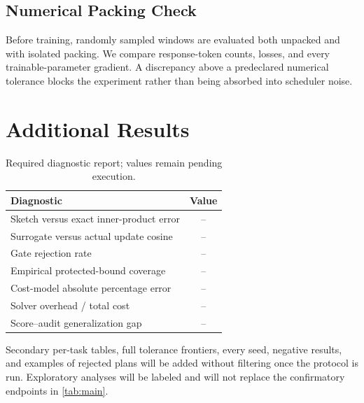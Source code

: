 \documentclass{article}
\begin{document}
\subsection{Numerical Packing Check}
Before training, randomly sampled windows are evaluated both unpacked and with
isolated packing. We compare response-token counts, losses, and every
trainable-parameter gradient. A discrepancy above a predeclared numerical
tolerance blocks the experiment rather than being absorbed into scheduler
noise.

\section{Additional Results}
\label{app:additional}

\begin{table}[h]
\caption{Required diagnostic report; values remain pending execution.}
\centering
\begin{tabular}{lc}
\toprule
Diagnostic & Value \\
\midrule
Sketch versus exact inner-product error & -- \\
Surrogate versus actual update cosine & -- \\
Gate rejection rate & -- \\
Empirical protected-bound coverage & -- \\
Cost-model absolute percentage error & -- \\
Solver overhead / total cost & -- \\
Score--audit generalization gap & -- \\
\bottomrule
\end{tabular}
\end{table}

Secondary per-task tables, full tolerance frontiers, every seed, negative
results, and examples of rejected plans will be added without filtering once
the protocol is run. Exploratory analyses will be labeled and will not replace
the confirmatory endpoints in \cref{tab:main}.
\end{document}
